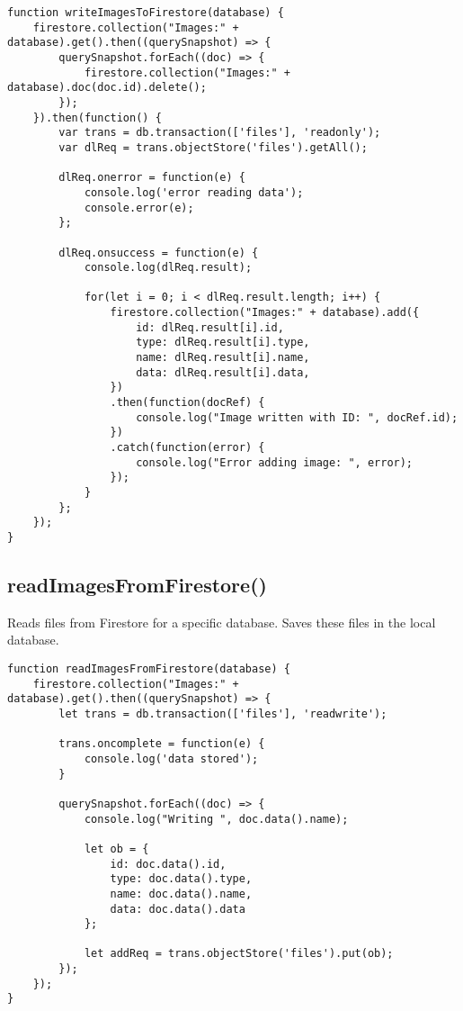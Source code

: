 \documentclass[letterpaper]{article}
\begin{document}
\begin{lstlisting}[firstnumber=1]
function writeImagesToFirestore(database) {
    firestore.collection("Images:" + database).get().then((querySnapshot) => {
        querySnapshot.forEach((doc) => {
            firestore.collection("Images:" + database).doc(doc.id).delete();
        });
    }).then(function() {
        var trans = db.transaction(['files'], 'readonly');
        var dlReq = trans.objectStore('files').getAll();

        dlReq.onerror = function(e) {
            console.log('error reading data');
            console.error(e);
        };

        dlReq.onsuccess = function(e) {
            console.log(dlReq.result);

            for(let i = 0; i < dlReq.result.length; i++) {
                firestore.collection("Images:" + database).add({
                    id: dlReq.result[i].id,
                    type: dlReq.result[i].type,
                    name: dlReq.result[i].name,
                    data: dlReq.result[i].data,
                })
                .then(function(docRef) {
                    console.log("Image written with ID: ", docRef.id);
                })
                .catch(function(error) {
                    console.log("Error adding image: ", error);
                });
            }
        };
    });
}
\end{lstlisting}

\subsection{readImagesFromFirestore()}

Reads files from Firestore for a specific database.
Saves these files in the local database.

\begin{lstlisting}[firstnumber=36]
function readImagesFromFirestore(database) {
    firestore.collection("Images:" + database).get().then((querySnapshot) => {
        let trans = db.transaction(['files'], 'readwrite');

        trans.oncomplete = function(e) {
            console.log('data stored');
        }

        querySnapshot.forEach((doc) => {
            console.log("Writing ", doc.data().name);

            let ob = {
                id: doc.data().id,
                type: doc.data().type,
                name: doc.data().name,
                data: doc.data().data
            };

            let addReq = trans.objectStore('files').put(ob);
        });
    });
}
\end{lstlisting}
\end{document}
